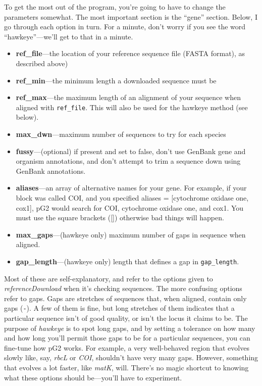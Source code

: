 \documentclass[12pt]{article}
\begin{document}
To get the most out of the program, you're going to have to change the
parameters somewhat. The most important section is the ``gene''
section. Below, I go through each option in turn. For a minute, don't
worry if you see the word ``hawkeye''---we'll get to that in a minute.

\begin{itemize}
\item \textbf{ref\_file}---the location of your reference sequence
  file (FASTA format), as described above)
\item \textbf{ref\_min}---the minimum length a downloaded sequence must be
\item \textbf{ref\_max}---the maximum length of an alignment of your
  sequence when aligned with \texttt{ref\_file}. This will also be
  used for the hawkeye method (see below).
\item \textbf{max\_dwn}---maximum number of sequences to try for each species
\item \textbf{fussy}---(optional) if present and set to false, don't
  use GenBank gene and organism annotations, and don't attempt to trim
  a sequence down using GenBank annotations.
\item \textbf{aliases}---an array of alternative names for your
  gene. For example, if your block was called COI, and you specified
  aliases = [cytochrome oxidase one, cox1], pG2 would search for COI,
  cytochrome oxidase one, and cox1. You must use the square brackets
  ([]) otherwise bad things will happen.
\item \textbf{max\_gaps}---(hawkeye only) maximum number of gaps in
  sequence when aligned.
\item \textbf{gap\_length}---(hawkeye only) length that defines a gap
  in \texttt{gap\_length}.
\end{itemize}

Most of these are self-explanatory, and refer to the options given to
\emph{referenceDownload} when it's checking sequences. The more
confusing options refer to gaps. Gaps are stretches of sequences that,
when aligned, contain only gaps (\texttt{-}). A few of them is fine,
but long stretches of them indicates that a particular sequence isn't
of good quality, or isn't the locus it claims to be. The purpose of
\emph{hawkeye} is to spot long gaps, and by setting a tolerance on how
many and how long you'll permit those gaps to be for a particular
sequences, you can fine-tune how pG2 works. For example, a very
well-behaved region that evolves slowly like, say, \emph{rbcL} or
\emph{COI}, shouldn't have very many gaps. However, something that
evolves a lot faster, like \emph{matK}, will. There's no magic
shortcut to knowing what these options should be---you'll have to
experiment.
\end{document}

